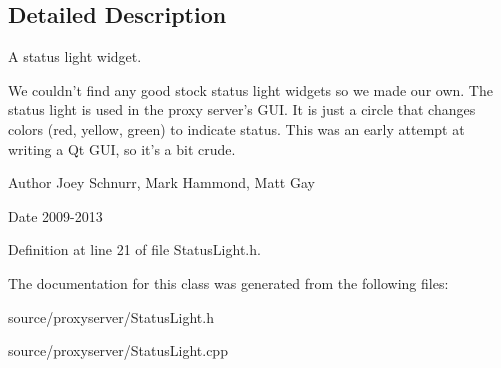 \subsection{Detailed Description}
A status light widget. 

We couldn't find any good stock status light widgets so we made our own. The status light is used in the proxy server's G\-U\-I. It is just a circle that changes colors (red, yellow, green) to indicate status. This was an early attempt at writing a Qt G\-U\-I, so it's a bit crude. \begin{DoxyAuthor}{Author}
Joey Schnurr, Mark Hammond, Matt Gay 
\end{DoxyAuthor}
\begin{DoxyDate}{Date}
2009-\/2013 
\end{DoxyDate}


Definition at line 21 of file Status\-Light.\-h.



The documentation for this class was generated from the following files\-:\begin{DoxyCompactItemize}
\item 
source/proxyserver/Status\-Light.\-h\item 
source/proxyserver/Status\-Light.\-cpp\end{DoxyCompactItemize}
